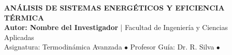 \documentclass[11pt]{article}
\begin{document}
\pagestyle{empty}

\begin{tcolorbox}[colback=nightblue, colframe=foxorange, boxrule=2.5pt, arc=4mm]
  \centering
  \vspace{0.2cm}
  {\Huge \bfseries \color{white} ANÁLISIS DE SISTEMAS ENERGÉTICOS Y EFICIENCIA TÉRMICA}\\[0.4cm]
  {\Large \color{foxorange} \textbf{Autor: Nombre del Investigador}} \quad 
  {\large \color{gray!30} | \quad Facultad de Ingeniería y Ciencias Aplicadas}\\[0.2cm]
  {\normalsize \color{gray!40} Asignatura: Termodinámica Avanzada \quad $\bullet$ \quad Profesor Guía: Dr. R. Silva \quad $\bullet$ }
  \vspace{0.2cm}
\end{tcolorbox}

\vspace{0.5cm}
\end{document}
